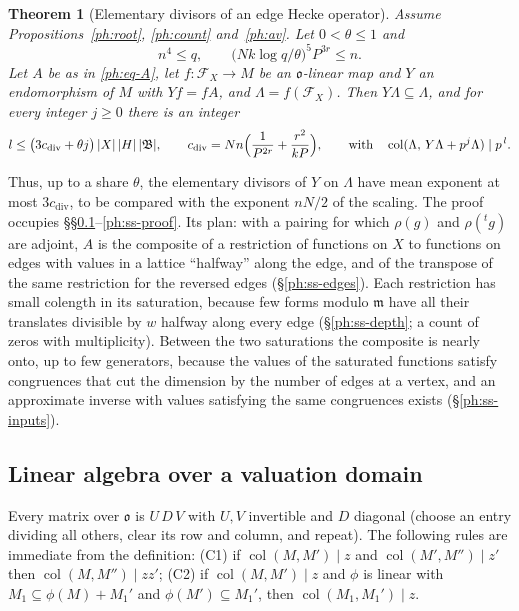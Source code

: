 \documentclass[10pt]{amsart}
\newtheorem{theorem}{Theorem}[section]
\theoremstyle{definition}
\theoremstyle{remark}
\providecommand{\aucol}{\operatorname{col}}
\providecommand{\pam}{\mathfrak m}
\providecommand{\pao}{\mathfrak o}
\providecommand{\phB}{\mathfrak B}
\providecommand{\phcd}{c_{\mathrm{div}}}
\begin{document}
\begin{theorem}[Elementary divisors of an edge Hecke operator]\label{ph:thm}
Assume Propositions~\ref{ph:root}, \ref{ph:count} and~\ref{ph:av}. Let $0<\theta\le1$ and
\begin{equation}\label{ph:eq-large}
n^4\le q,\qquad\bigl(Nk\log q/\theta\bigr)^5P^{3r}\le n .
\end{equation}
Let $A$ be as in \eqref{ph:eq-A}, let $f\colon\mathcal F_X\to M$ be an $\pao$-linear map and $Y$
an endomorphism of $M$ with $Yf=fA$, and $\Lambda=f(\mathcal F_X)$. Then $Y\Lambda\subseteq
\Lambda$, and for every integer $j\ge0$ there is an integer
\[
l\le\bigl(3\phcd+\theta j\bigr)\,|X|\,|H|\,|\phB|,\qquad\phcd=Nn\Bigl(\frac1{P^{2r}}+\frac{r^2}{kP}
\Bigr),\qquad\text{with}\quad\aucol(\Lambda,\,Y\Lambda+p^j\Lambda)\mid p^{\,l}.
\]
\end{theorem}

Thus, up to a share $\theta$, the elementary divisors of $Y$ on $\Lambda$ have mean exponent at
most $3\phcd$, to be compared with the exponent $nN/2$ of the scaling. The proof occupies
\S\S\ref{ph:ss-la}--\ref{ph:ss-proof}. Its plan: with a pairing for which $\rho(g)$ and
$\rho({}^tg)$ are adjoint, $A$ is the composite of a restriction of functions on $X$ to functions
on edges with values in a lattice ``halfway'' along the edge, and of the transpose of the same
restriction for the reversed edges (\S\ref{ph:ss-edges}). Each restriction has small colength in
its saturation, because few forms modulo $\pam$ have all their translates divisible by $w$ halfway
along every edge (\S\ref{ph:ss-depth}; a count of zeros with multiplicity). Between the two
saturations the composite is nearly onto, up to few generators, because the values of the saturated
functions satisfy congruences that cut the dimension by the number of edges at a vertex, and an
approximate inverse with values satisfying the same congruences exists (\S\ref{ph:ss-inputs}).

\subsection{Linear algebra over a valuation domain}\label{ph:ss-la}
Every matrix over $\pao$ is $U\,D\,V$ with $U,V$ invertible and $D$ diagonal (choose an entry
dividing all others, clear its row and column, and repeat). The following rules are immediate
from the definition: (C1) if $\aucol(M,M')\mid z$ and $\aucol(M',M'')\mid z'$ then
$\aucol(M,M'')\mid zz'$; (C2) if $\aucol(M,M')\mid z$ and $\phi$ is linear with
$M_1\subseteq\phi(M)+M_1'$ and $\phi(M')\subseteq M_1'$, then $\aucol(M_1,M_1')\mid z$.
\end{document}
